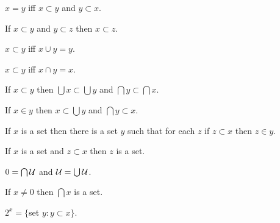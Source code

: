 \documentclass[a4paper,draft]{amsproc}
\begin{document}
\begin{forthel}
\begin{theorem}
$x = y$ iff $x \subset y$ and $y \subset x$.
\end{theorem}

\begin{theorem}
If $x \subset y$ and $y \subset z$ then $x \subset z$.
\end{theorem}

\begin{theorem}
$x \subset y$ iff $x \cup y = y$.
\end{theorem}

\begin{theorem}
$x \subset y$ iff $x \cap y = x$.
\end{theorem}

\begin{theorem}
If $x \subset y$ then $\bigcup x \subset \bigcup y$
and $\bigcap y \subset \bigcap x$.
\end{theorem}

\begin{theorem}
If $x \in y$ then $x \subset \bigcup y$ 
and $\bigcap y \subset x$.
\end{theorem}


\begin{axiom}
If $x$ is a set then there is a set $y$ such that for each
$z$ if $z \subset x$ then $z \in y$.
\end{axiom}


\begin{theorem}
If $x$ is a set and $z \subset x$ then $z$ is a set.
\end{theorem}

\begin{theorem}
$0 = \bigcap \cal{U}$ and $\cal{U} = \bigcup \cal{U}$.
\end{theorem}

\begin{theorem}
If $x \neq 0$ then $\bigcap x$ is a set.
\end{theorem}

\begin{definition} $2^{x} = \{$set $y : y \subset x\}$.\end{definition}


\end{forthel}
\end{document}
